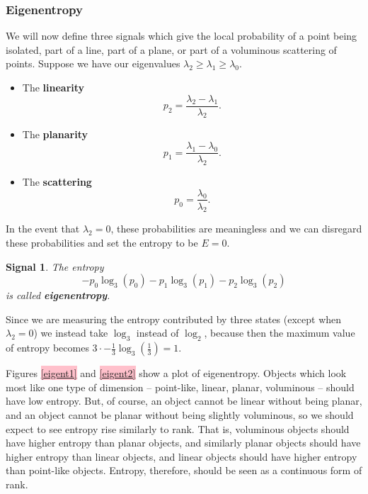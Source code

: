 \documentclass[a4paper,11pt,twoside]{article}
\newtheorem*{signals}{Signal}
\theoremstyle{definition}
\theoremstyle{remark}
\newcommand{\sh}[1]{\colorbox{pink}{#1}}
\newcommand{\lnk}[1]{\sh{\hyperref[#1]{\ref*{#1}}}}
\newenvironment{sigs}
   {\colorlet{shadecolor}{green!50}\begin{shaded}\begin{signals}}
   {\end{signals}\end{shaded}}
\begin{document}
\subsubsection{Eigenentropy}
We will now define three signals which give the local probability of a point being isolated, part of a line, part of a plane, or part of a voluminous scattering of points. Suppose we have our eigenvalues $\lambda_2\geqslant \lambda_1\geqslant \lambda_0$.
\begin{itemize}
\item The \textbf{linearity}
\begin{displaymath}
p_2=\frac{\lambda_2-\lambda_1}{\lambda_2}.
\end{displaymath}
\item The \textbf{planarity}
\begin{displaymath}
p_1=\frac{\lambda_1-\lambda_0}{\lambda_2}.
\end{displaymath}
\item The \textbf{scattering}
\begin{displaymath}
p_0=\frac{\lambda_0}{\lambda_2}.
\end{displaymath}
\end{itemize}
In the event that $\lambda_2=0$, these probabilities are meaningless and we can disregard these probabilities and set the entropy to be $E=0$. 
\begin{sigs}The entropy
\begin{displaymath}
-p_0\log_3(p_0)-p_1\log_3(p_1)-p_2\log_3(p_2)
\end{displaymath}
is called \textbf{eigenentropy}.
\end{sigs} 
Since we are measuring the entropy contributed by three states (except when $\lambda_2=0$) we instead take $\log_3$ instead of $\log_2$, because then the maximum value of entropy becomes $3\cdot -\frac{1}{3}\log_3(\frac{1}{3})=1$.

Figures \lnk{eigent1} and \lnk{eigent2} show a plot of eigenentropy. Objects which look most like one type of dimension -- point-like, linear, planar, voluminous -- should have low entropy. But, of course, an object cannot be linear without being planar, and an object cannot be planar without being slightly voluminous, so we should expect to see entropy rise similarly to rank. That is, voluminous objects should have higher entropy than planar objects, and similarly planar objects should have higher entropy than linear objects, and linear objects should have higher entropy than point-like objects. Entropy, therefore, should be seen as a continuous form of rank.
\end{document}
